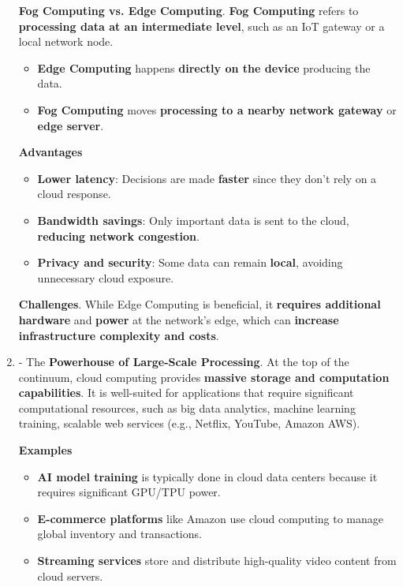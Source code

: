 \begin{enumerate}
    \textcolor{Red2}{ \textbf{Fog Computing vs. Edge Computing}}. \textbf{Fog Computing} refers to \textbf{processing data at an intermediate level}, such as an IoT gateway or a local network node.
    \begin{itemize}
        \item \textbf{Edge Computing} happens \textbf{directly on the device} producing the data.
        \item \textbf{Fog Computing} moves \textbf{processing to a nearby network gateway} or \textbf{edge server}.
    \end{itemize}

\newpage

    \textcolor{Green3}{ \textbf{Advantages}}
    \begin{itemize}[label=\textcolor{Green3}{}]
        \item \textcolor{Green3}{\textbf{Lower latency}}: Decisions are made \textbf{faster} since they don't rely on a cloud response.
        \item \textcolor{Green3}{\textbf{Bandwidth savings}}: Only important data is sent to the cloud, \textbf{reducing network congestion}.
        \item \textcolor{Green3}{\textbf{Privacy and security}}: Some data can remain \textbf{local}, avoiding unnecessary cloud exposure.
    \end{itemize}

    \textcolor{Red2}{ \textbf{Challenges}}. While Edge Computing is beneficial, it \textbf{requires additional hardware} and \textbf{power} at the network's edge, which can \textbf{increase infrastructure complexity and costs}.


    \item {} - The \textbf{Powerhouse of Large-Scale Processing}. At the top of the continuum, cloud computing provides \textbf{massive storage and computation capabilities}. It is well-suited for applications that require significant computational resources, such as big data analytics, machine learning training, scalable web services (e.g., Netflix, YouTube, Amazon AWS).
    
    \textcolor{Green3}{ \textbf{Examples}}
    \begin{itemize}
        \item \textbf{AI model training} is typically done in cloud data centers because it requires significant GPU/TPU power.
        \item \textbf{E-commerce platforms} like Amazon use cloud computing to manage global inventory and transactions.
        \item \textbf{Streaming services} store and distribute high-quality video content from cloud servers.
    \end{itemize}


\end{enumerate}
